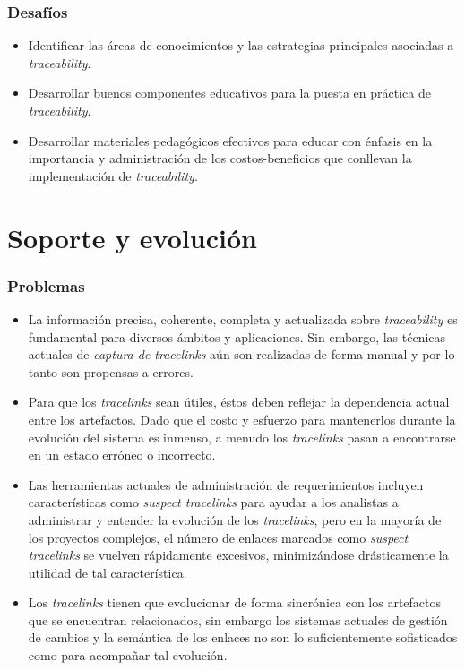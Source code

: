 \documentclass[a4paper,12pt,oneside,spanish]{book}
\begin{document}
\subsubsection{Desafíos}

\begin{itemize}[label={\checkmark}]
\item Identificar las áreas de conocimientos y las estrategias principales asociadas a \textit{traceability}.

\item Desarrollar buenos componentes educativos para la puesta en práctica de \textit{traceability}.

\item Desarrollar materiales pedagógicos efectivos para educar con énfasis en la importancia y administración de los costos-beneficios que conllevan la implementación de \textit{traceability}.

\end{itemize}

\section{Soporte y evolución}

\subsubsection{Problemas}

\begin{itemize}[label={$\times$}]

\item La información precisa, coherente, completa y actualizada sobre \textit{traceability} es fundamental para diversos ámbitos y aplicaciones. Sin embargo, las técnicas actuales de \textit{captura de tracelinks} aún son realizadas de forma manual y por lo tanto son propensas a errores.

\item Para que los \textit{tracelinks} sean útiles, éstos deben reflejar la dependencia actual entre los artefactos. Dado que el costo y esfuerzo para mantenerlos durante la evolución del sistema es inmenso, a menudo los \textit{tracelinks} pasan a encontrarse en un estado erróneo o incorrecto.

\item Las herramientas actuales de administración de requerimientos incluyen características como \textit{suspect tracelinks} para ayudar a los analistas a administrar y entender la evolución de los \textit{tracelinks}, pero en la mayoría de los proyectos complejos, el número de enlaces marcados como \textit{suspect tracelinks} se vuelven rápidamente excesivos, minimizándose drásticamente la utilidad de tal característica.
 
\item Los \textit{tracelinks} tienen que evolucionar de forma sincrónica con los artefactos que se encuentran relacionados, sin embargo los sistemas actuales de gestión de cambios y la semántica de los enlaces no son lo suficientemente sofisticados como para acompañar tal evolución.

\end{itemize}
\end{document}
